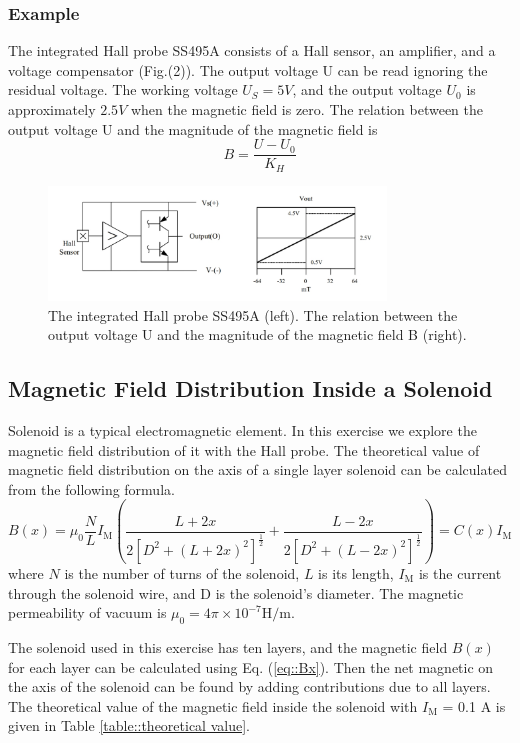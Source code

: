 \documentclass[a4paper]{article}
\begin{document}
\subsubsection{Example}
The integrated Hall probe SS495A consists of a Hall sensor, an amplifier, and a voltage compensator (Fig.(2)). The output voltage U can be read ignoring the residual
voltage. The working voltage $ U_S = 5 V $, and the output voltage $ U_0 $ is approximately $ 2.5 V $ when the magnetic field is zero. The relation between the output
voltage U and the magnitude of the magnetic field is
\begin{equation}
	B=\dfrac{U-U_0}{K_H}
	\label{eq::magnetic field}
\end{equation}
\begin{figure}[!htbp]
	\centering
	\includegraphics[width=0.8\textwidth]{integrated Hall probe.png}
	\caption{The integrated Hall probe SS495A (left). The relation between the output voltage U and the magnitude of the magnetic field B (right).}
\end{figure}

\subsection{Magnetic Field Distribution Inside a Solenoid}
Solenoid is a typical electromagnetic element. In this exercise we explore the magnetic field distribution of it with the Hall probe. The theoretical value of magnetic
field distribution on the axis of a single layer solenoid can be calculated from the following formula.
\begin{equation}
	B(x) = \mu_0\frac{N}{L}I_\text{M}\left(\frac{L+2x}{2[D^2+(L+2x)^2]^{\frac{1}{2}}}+\frac{L-2x}{2[D^2+(L-2x)^2]^{\frac{1}{2}}}\right) = C(x)I_\text{M}
	\label{eq::Bx}
\end{equation}
where $N$ is the number of turns of the solenoid, $L$ is its length, $I_\text{M}$ is the current through the solenoid wire, and D is the solenoid’s diameter. The
magnetic permeability of vacuum is $\mu_0 = 4\pi \times 10^{-7} \text{H}/\text{m}.$
\par The solenoid used in this exercise has ten layers, and the magnetic field $B(x)$ for each layer can be calculated using Eq. (\ref{eq::Bx}). Then the net magnetic
on the axis of the solenoid can be found by adding contributions due to all layers. The theoretical value of the magnetic field inside the solenoid with $I_\text{M}$ =
0.1 A is given in Table \ref{table::theoretical value}.
\end{document}
